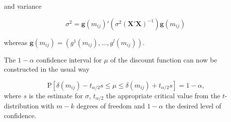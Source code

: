and variance

\begin{equation*}
\sigma^2 = \bm{g}(m_{ij})'\left(\sigma^2(\bm{X' X})^{-1} \right)\bm{g}(m_{ij})\,
\end{equation*}

whereas $\bm{g}(m_{ij})= \left(g^1(m_{ij}), \dots, g^l(m_{ij}) \right)$.

The $1- \alpha$ confidence interval for $\mu$ of the discount function can now be constructed in the usual way

\begin{equation*}
\label{eq:cint}
\mbox{P}\left[ \delta(m_{ij}) - t_{\alpha / 2} s   \leq \mu  \leq \delta(m_{ij})  + t_{\alpha / 2} s\right]= 1 - \alpha,
\end{equation*} 
where $s$ is the estimate for $\sigma$, $t_{\alpha / 2}$ the appropriate critical value from the $t$-distribution with $m-k$ degrees of freedom and $1-\alpha$ the desired level of confidence. 


